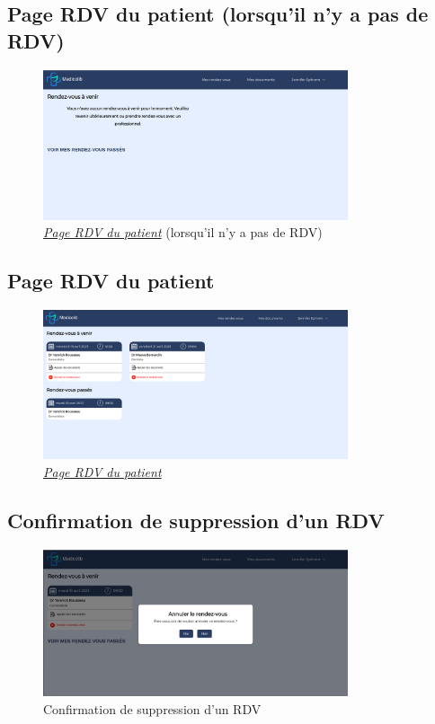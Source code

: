 \documentclass[a4paper]{report}
\begin{document}
\subsection{Page RDV du patient (lorsqu'il n'y a pas de RDV)}
\begin{figure}[H]
    \vspace{-10pt}
    \centering
    \includegraphics[width=0.8\textwidth]{captures/no-rdv.png}
    \caption{\textit{\hyperref[appointments]{Page RDV du patient}} (lorsqu'il n'y a pas de RDV)}
    \label{fig:DCU17}
\end{figure}

\subsection{Page RDV du patient}
\begin{figure}[H]
    \vspace{-10pt}
    \centering
    \includegraphics[width=0.8\textwidth]{captures/rdv-dispo.png}
    \caption{\textit{\hyperref[appointments]{Page RDV du patient}}}
    \label{fig:DCU18}
\end{figure}

\subsection{Confirmation de suppression d'un RDV}
\begin{figure}[H]
    \vspace{-10pt}
    \centering
    \includegraphics[width=0.8\textwidth]{captures/remove-rdv.png}
    \caption{Confirmation de suppression d'un RDV}
    \label{fig:DCU19}
\end{figure}
\end{document}

